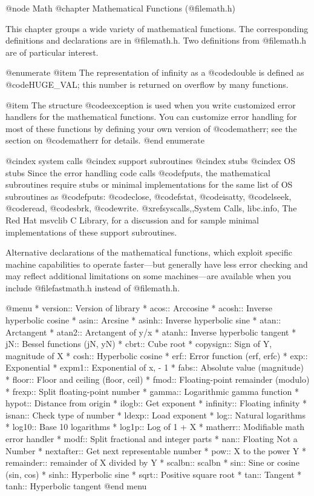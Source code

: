 @node Math
@chapter Mathematical Functions (@file{math.h})

This chapter groups a wide variety of mathematical functions.  The
corresponding definitions and declarations are in @file{math.h}.  
Two definitions from @file{math.h} are of particular interest.  

@enumerate
@item
The representation of infinity as a @code{double} is defined as
@code{HUGE_VAL}; this number is returned on overflow by many functions.

@item
The structure @code{exception} is used when you write customized error
handlers for the mathematical functions.  You can customize error
handling for most of these functions by defining your own version of
@code{matherr}; see the section on @code{matherr} for details.
@end enumerate

@cindex system calls
@cindex support subroutines
@cindex stubs
@cindex OS stubs
Since the error handling code calls @code{fputs}, the mathematical
subroutines require stubs or minimal implementations for the same list
of OS subroutines as @code{fputs}: @code{close}, @code{fstat},
@code{isatty}, @code{lseek}, @code{read}, @code{sbrk}, @code{write}.
@xref{syscalls,,System Calls, libc.info, The Red Hat msvclib C Library},
for a discussion and for sample minimal implementations of these support
subroutines.

Alternative declarations of the mathematical functions, which exploit
specific machine capabilities to operate faster---but generally have
less error checking and may reflect additional limitations on some
machines---are available when you include @file{fastmath.h} instead of
@file{math.h}.

@menu 
* version::	Version of library
* acos::	Arccosine
* acosh::	Inverse hyperbolic cosine
* asin::	Arcsine
* asinh::	Inverse hyperbolic sine
* atan::	Arctangent
* atan2::	Arctangent of y/x
* atanh::	Inverse hyperbolic tangent
* jN::	        Bessel functions  (jN, yN)
* cbrt::	Cube root
* copysign::	Sign of Y, magnitude of X
* cosh::	Hyperbolic cosine
* erf::		Error function  (erf, erfc)
* exp::		Exponential
* expm1::	Exponential of x, - 1
* fabs::	Absolute value (magnitude)
* floor::	Floor and ceiling  (floor, ceil)
* fmod::	Floating-point remainder (modulo)
* frexp::	Split floating-point number
* gamma::	Logarithmic gamma function
* hypot::	Distance from origin
* ilogb::	Get exponent
* infinity::	Floating infinity
* isnan::	Check type of number
* ldexp::	Load exponent
* log::		Natural logarithms
* log10::	Base 10 logarithms
* log1p::	Log of 1 + X
* matherr::	Modifiable math error handler
* modf::	Split fractional and integer parts
* nan::		Floating Not a Number
* nextafter::	Get next representable number
* pow::		X to the power Y
* remainder::	remainder of X divided by Y 
* scalbn::	scalbn
* sin::		Sine or cosine (sin, cos)
* sinh::	Hyperbolic sine
* sqrt::	Positive square root
* tan::		Tangent
* tanh::	Hyperbolic tangent
@end menu


